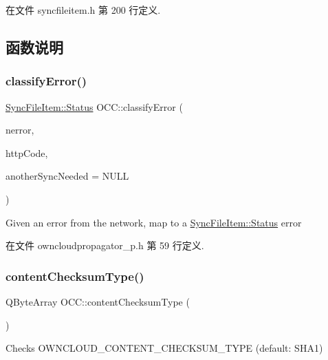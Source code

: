 在文件 syncfileitem.\+h 第 200 行定义.



\subsection{函数说明}
\mbox{\label{namespace_o_c_c_ab4a5246da8073b7b1f68eff9e8cd543f}} 
\subsubsection{\texorpdfstring{classify\+Error()}{classifyError()}}
{\footnotesize\ttfamily \hyperlink{class_o_c_c_1_1_sync_file_item_a149ade86eddd9661587bfbc9bcbca408}{Sync\+File\+Item\+::\+Status} O\+C\+C\+::classify\+Error (\begin{DoxyParamCaption}\item[{Q\+Network\+Reply\+::\+Network\+Error}]{nerror,  }\item[{int}]{http\+Code,  }\item[{bool $\ast$}]{another\+Sync\+Needed = {\ttfamily NULL} }\end{DoxyParamCaption})}

Given an error from the network, map to a \hyperlink{class_o_c_c_1_1_sync_file_item_a149ade86eddd9661587bfbc9bcbca408}{Sync\+File\+Item\+::\+Status} error 

在文件 owncloudpropagator\+\_\+p.\+h 第 59 行定义.

\mbox{\label{namespace_o_c_c_a6341c56b4b72b2fcc60449285f9f7c38}} 
\subsubsection{\texorpdfstring{content\+Checksum\+Type()}{contentChecksumType()}}
{\footnotesize\ttfamily Q\+Byte\+Array O\+C\+C\+::content\+Checksum\+Type (\begin{DoxyParamCaption}{ }\end{DoxyParamCaption})}



Checks O\+W\+N\+C\+L\+O\+U\+D\+\_\+\+C\+O\+N\+T\+E\+N\+T\+\_\+\+C\+H\+E\+C\+K\+S\+U\+M\+\_\+\+T\+Y\+PE (default\+: S\+H\+A1) 



